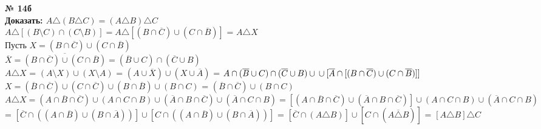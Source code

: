 \documentclass[12pt]{article}
\begin{document}
\vspace{.5cm}
{
	{\textbf{№ 14б} \vspace{.5cm}\\}
	\textbf{\large{Доказать: $A \triangle (B \triangle C) = (A \triangle B) \triangle C$\vspace{.2cm} \\}}
	$A \triangle [(B \setminus C) \cap (C \setminus B)] = A \triangle [(B \cap \overline{C})
	\cup (C \cap \overline{B})]$ = $A \triangle X$\\
	Пусть $X = (B \cap \overline{C}) \cup (C \cap \overline{B})$\\
	$\overline{X} = \overline{(B \cap \overline{C}) \cup (C \cap \overline{B})} = 
	(\overline{B} \cup C ) \cap (\overline{C} \cup B)$\\
	$A \triangle X$ = $(A \setminus X) \cup (X \setminus A)$ = $(A \cup \overline{X}) \cup 
	(X \cup \overline{A})$ = $A \cap (\overline{B} \cup C) \cap (\overline{C} \cup B) \cup\\
	\cup [\overline{A} \cap [(B \cap \overline{C}) \cup (C \cap \overline{B})]]$\\
	$X = (\overline{B} \cap \overline{C}) \cup (C \cap \overline{C}) \cup (B \cap \overline{B})
	\cup (B \cap C)$ = $(\overline{B} \cap \overline{C}) \cup (B \cap C)$\\
	$A \triangle X = (A \cap \overline{B} \cap \overline{C}) \cup (A \cap C \cap B) \cup 
	(\overline{A} \cap B \cap \overline{C}) \cup (\overline{A} \cap C \cap B) = 
	[(A \cap \overline{B} \cap \overline{C}) \cup (\overline{A} \cap B \cap \overline{C})] \cup
	(A \cap C \cap B) \cup (\overline{A} \cap C \cap B)$ = $[\overline{C} \cap ((A \cap \overline{B}) \cup (B \cap \overline{A}))] \cup [C \cap ((A \cap \overline{B}) \cup (B \cap \overline{A}))]$ = $[\overline{C} \cap (A \triangle B)] \cup [C \cap (\overline{A \triangle B})]$ = $[A \triangle B] \triangle C$
	
}
\end{document}
